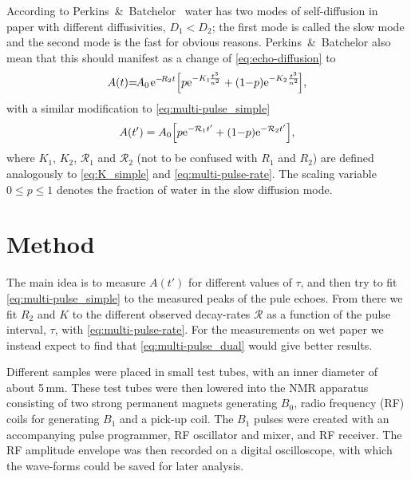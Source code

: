 \documentclass[11pt,a4paper, twocolumn,
swedish, english %
]{article}
\begin{document}
According to Perkins~\&~Batchelor~\cite{Perkins-Batchelor2012} water
has two modes of self-diffusion in paper with different diffusivities,
$D_1<D_2$; the first mode is called the slow mode and the second mode
is the fast for obvious reasons. Perkins~\&~Batchelor also mean that
this should manifest as a change of 
\eqref{eq:echo-diffusion} to
\begin{equation}
\begin{aligned}
A(t){=}\hspace{-1pt}A_0\hspace{1pt}
\mathrm{e}^{{-}\!R_2t}\qty[
p\mathrm{e}^{{-}K_1\!\frac{t^3}{n^2}} + (1{-}p)\mathrm{e}^{{-}K_2\frac{t^3}{n^2}}
\!],
\end{aligned}
\end{equation}
with a similar modification to \eqref{eq:multi-pulse_simple}
\begin{equation}\label{eq:multi-pulse_dual}
A(t')=A_0\qty[p\mathrm{e}^{-\mathcal{R}_1t'}+
(1{-}p)\mathrm{e}^{-\mathcal{R}_2t'}],
\end{equation}
where $K_1$, $K_2$, $\mathcal{R}_1$ and $\mathcal{R}_2$ (not to be
confused with $R_1$ and $R_2$) are defined analogously to
\eqref{eq:K_simple} and \eqref{eq:multi-pulse-rate}. The
scaling variable $0\le p\le1$ denotes the fraction of water in the
slow diffusion mode. 



\section{Method} \label{sec:met}
The main idea is to measure $A(t')$ for different values of $\tau$,
and then try to fit \eqref{eq:multi-pulse_simple} to the measured
peaks of the pule echoes. From there we fit $R_2$ and $K$ to the
different observed decay-rates $\mathcal{R}$ as a function of the
pulse interval, $\tau$, with \eqref{eq:multi-pulse-rate}. For the
measurements on wet paper we instead expect to find that
\eqref{eq:multi-pulse_dual} would give better results.

Different samples were placed in small test tubes, with an inner
diameter of about 5\,mm. These test tubes were then lowered into the
NMR apparatus consisting of two strong permanent magnets generating
$B_0$, radio frequency (RF) coils for generating $B_1$ and a pick-up
coil. The $B_1$ pulses were created with an accompanying pulse
programmer, RF oscillator and mixer, and RF receiver. The RF amplitude
envelope was then recorded on a digital oscilloscope, with which the
wave-forms could be saved for later analysis. 
\end{document}
